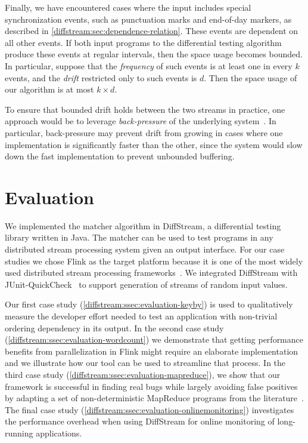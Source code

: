 Finally, we have encountered cases where the input includes special synchronization events, such as punctuation marks and end-of-day markers, as described in \cref{diffstream:sec:dependence-relation}. These events are dependent on all other events. If both input programs to the differential testing algorithm produce these events at regular intervals, then the space usage becomes bounded. In particular, suppose that the \emph{frequency} of such events is at least one in every $k$ events, and the \emph{drift} restricted only to such events is $d$. Then the space usage of our algorithm is at most $k \times d$.

To ensure that bounded drift holds between the two streams in practice, one approach would be to leverage \emph{back-pressure} of the underlying system~\cite{collins2009flexible,Heron2015,chen2017governor}.
In particular, back-pressure may prevent drift from growing in cases where one implementation is significantly faster than the other, since the system would slow down the fast implementation to prevent unbounded buffering.

\section{Evaluation}
\label{diffstream:sec:evaluation}

We implemented the matcher algorithm in DiffStream, a differential
testing library written in Java. The matcher can be used to test
programs in any distributed stream processing system given an output
interface. For our case studies we chose Flink as the target platform
because it is one of the most widely used distributed stream
processing
frameworks~\cite{stackoverflow-flink}. We
integrated DiffStream with JUnit-QuickCheck~\cite{junit-quickcheck} to
support generation of streams of random input values.

Our first case study (\cref{diffstream:ssec:evaluation-keyby}) is used to qualitatively measure the developer effort needed to test an application with non-trivial ordering dependency in its output. In the second case study (\cref{diffstream:ssec:evaluation-wordcount}) we demonstrate that getting performance benefits from parallelization in Flink might require an elaborate implementation and we illustrate how our tool can be used to streamline that process. In the third case study (\cref{diffstream:ssec:evaluation-mapreduce}), we show that our framework is successful in finding real bugs while largely avoiding false positives by adapting a set of non-deterministic MapReduce programs from the literature~\cite{xiao2014nondeterminism}. The final case study (\cref{diffstream:ssec:evaluation-onlinemonitoring}) investigates the performance overhead when using DiffStream{} for online monitoring of long-running applications.


